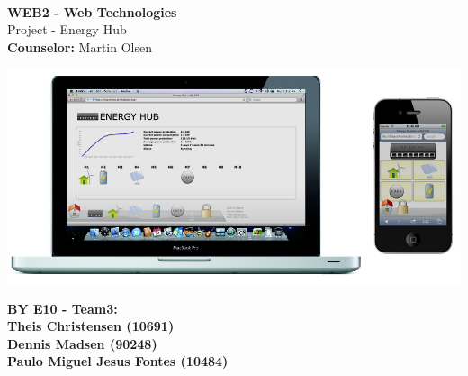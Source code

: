 
\begin{centering}
\thispagestyle{empty} %
\begin{center}
\vspace{5cm}
\textbf{\Huge {\\ \vspace{1cm}WEB2 - Web Technologies}}\\
\huge {Project - Energy Hub}\\ \vspace{0.5cm}
\large{\textbf{Counselor:} Martin Olsen}\\ \vspace{1.5cm}
\end{center}

\centering
\includegraphics[width=1.0\textwidth]{images/frontpage.png}
 \end{centering}
\vspace{1.5cm}
\begin{center}
\Large{\textbf{BY E10 - Team3: \\ \vspace{0.3cm}Theis Christensen (10691)\\ \vspace{0.7cm}Dennis Madsen (90248)\\  \vspace{0.7cm}Paulo Miguel Jesus Fontes (10484)}}
\end{center}